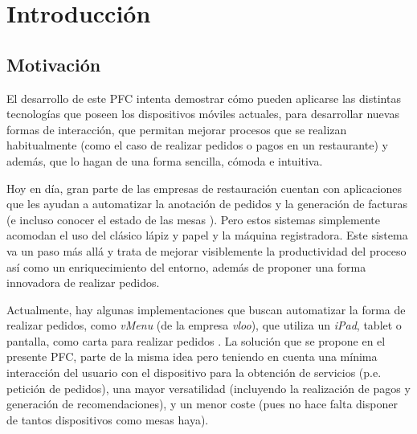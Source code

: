 
\chapter{Introducción}

\section{Motivación}
El desarrollo de este \acs{PFC} intenta demostrar cómo pueden aplicarse las
distintas tecnologías que poseen los dispositivos móviles actuales, para
desarrollar nuevas formas de interacción, que permitan mejorar procesos
que se realizan habitualmente (como el caso de realizar pedidos o pagos en un
restaurante) y además, que lo hagan de una forma sencilla, cómoda e intuitiva.

Hoy en día, gran parte de las empresas de restauración cuentan con aplicaciones
que les ayudan a automatizar la anotación de pedidos y la generación de
facturas (e incluso conocer el estado de las mesas \cite{bib:DHC}). Pero estos
sistemas simplemente acomodan el uso del clásico lápiz y papel y la máquina
registradora. Este sistema va un paso más allá y trata de mejorar visiblemente
la productividad del proceso así como un enriquecimiento del entorno, además
de proponer una forma innovadora de realizar pedidos.

Actualmente, hay algunas implementaciones que buscan automatizar la forma
de realizar pedidos, como \emph{vMenu} (de la empresa \emph{vloo}), que
utiliza un \emph{iPad}, tablet o pantalla, como carta para realizar pedidos 
\cite{bib:vMenu}. La solución que se propone en el presente PFC, parte de la
misma idea pero teniendo en cuenta una mínima interacción del usuario con el 
dispositivo para la obtención de servicios (p.e. petición de pedidos), una 
mayor versatilidad (incluyendo la realización de pagos\cite{bib:Pay} y 
generación de recomendaciones), y un menor coste (pues no hace falta disponer 
de tantos dispositivos como mesas haya).

